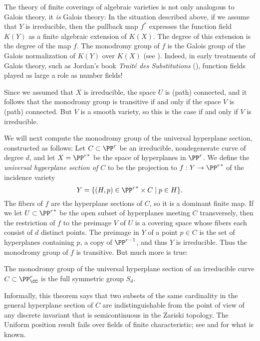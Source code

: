 \begin{fact}\label{Galois equals monodromy}
The theory of finite coverings of algebraic varieties is not only analogous to Galois theory, it \emph{is} Galois theory: In the situation described above, if we assume that $Y$ is irreducible, then the pullback map $f^*$ expresses the function field $K(Y)$ as a finite algebraic extension of $K(X)$. The degree of this extension is the degree of the map $f$. The monodromy group of $f$  is the Galois group of the Galois normalization of $K(Y)$ over $K(X)$ (see \cite{Harris1979}). Indeed, in early treatments of Galois theory, such as Jordan's book \emph{Trait\'e des Substitutions} (\cite{}), function fields played as large a role as number fields!
\end{fact}

Since we assumed that $X$ is irreducible, the space $U$ is (path) connected, and it follows that the monodromy group is transitive if and only if the space $V$ is (path) connected. But $V$ is a smooth
variety, so this is the case if and only if $V$ is irreducible.

We will next compute the monodromy group of the  universal hyperplane section, constructed as follows:
Let $C \subset \PP^r$ be an irreducible, nondegenerate curve of degree $d$, and let $X = {\PP^r}^*$ be the space of hyperplanes in $\PP^r$. We define the \emph{universal hyperplane section of $C$} to be the projection to $f: Y\to {\PP^r}^*$ of the incidence variety
$$
Y = \{ (H, p) \in {\PP^r}^* \times C \mid p \in H \}.
$$
The fibers of $f$ are the hyperplane
sections of $C$, so it is a dominant finite map. If we let $U\subset {\PP^r}^*$ be the open subset of hyperplanes
meeting $C$ transversely, then the restriction of $f$ to the preimage $V$ of $U$ is a covering space
whose fibers each consist of $d$ distinct points. The preimage in $Y$ of a point $p\in C$ is the set of hyperplanes containing
$p$, a copy of $\PP^{r-1}$, and thus $Y$ is irreducible. Thus the monodromy group of $f$ is transitive. But much more is true:

\begin{theorem}\label{uniform position lemma}
The monodromy group of the universal hyperplane section of an irreducible curve $C \subset \PP^r_\CC$ is the full symmetric group $S_d$.
\end{theorem}

Informally, this theorem says that two subsets of the same cardinality in the general hyperplane section of $C$
are indistinguishable from the point of view of any discrete invariant that is semicontinuous in the Zariski topology. 
The Uniform position result fails over fields of finite characteristic; see \cite{Rathmann} and \cite{Kadets} for what is known. 

